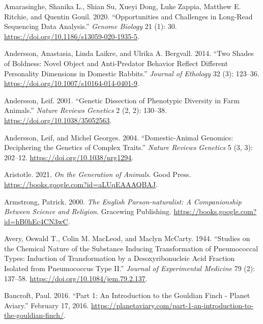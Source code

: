 \documentclass[
]{book}
\newlength{\cslhangindent}
\newlength{\cslentryspacingunit} %
\newenvironment{CSLReferences}[2] %
 {%
  \setlength{\parindent}{0pt}
  \ifodd #1
  \let\oldpar\par
  \def\par{\hangindent=\cslhangindent\oldpar}
  \fi
  \setlength{\parskip}{#2\cslentryspacingunit}
 }%
 {}
\begin{document}
\begin{CSLReferences}{1}{0}
\leavevmode{}%
Amarasinghe, Shanika L., Shian Su, Xueyi Dong, Luke Zappia, Matthew E. Ritchie, and Quentin Gouil. 2020. {``Opportunities and Challenges in Long-Read Sequencing Data Analysis.''} \emph{Genome Biology} 21 (1): 30. \url{https://doi.org/10.1186/s13059-020-1935-5}.

\leavevmode{}%
Andersson, Anastasia, Linda Laikre, and Ulrika A. Bergvall. 2014. {``Two Shades of Boldness: Novel Object and Anti-Predator Behavior Reflect Different Personality Dimensions in Domestic Rabbits.''} \emph{Journal of Ethology} 32 (3): 123--36. \url{https://doi.org/10.1007/s10164-014-0401-9}.

\leavevmode{}%
Andersson, Leif. 2001. {``Genetic Dissection of Phenotypic Diversity in Farm Animals.''} \emph{Nature Reviews Genetics} 2 (2, 2): 130--38. \url{https://doi.org/10.1038/35052563}.

\leavevmode{}%
Andersson, Leif, and Michel Georges. 2004. {``Domestic-Animal Genomics: Deciphering the Genetics of Complex Traits.''} \emph{Nature Reviews Genetics} 5 (3, 3): 202--12. \url{https://doi.org/10.1038/nrg1294}.

\leavevmode{}%
Aristotle. 2021. \emph{On the {Generation} of {Animals}}. {Good Press}. \url{https://books.google.com?id=aLUqEAAAQBAJ}.

\leavevmode{}%
Armstrong, Patrick. 2000. \emph{The {English Parson-naturalist}: {A Companionship Between Science} and {Religion}}. {Gracewing Publishing}. \url{https://books.google.com?id=hB0hEc4CN3wC}.

\leavevmode{}%
Avery, Oswald T., Colin M. MacLeod, and Maclyn McCarty. 1944. {``Studies on the Chemical Nature of the Substance Inducing Transformation of Pneumococcal Types: {Induction} of Transformation by a Desoxyribonucleic Acid Fraction Isolated from Pneumococcus Type {II}.''} \emph{Journal of Experimental Medicine} 79 (2): 137--58. \url{https://doi.org/10.1084/jem.79.2.137}.

\leavevmode{}%
Bancroft, Paul. 2016. {``Part 1: {An} Introduction to the {Gouldian} Finch - {Planet Aviary}.''} February 17, 2016. \url{https://planetaviary.com/part-1-an-introduction-to-the-gouldian-finch/}.


\end{CSLReferences}
\end{document}
